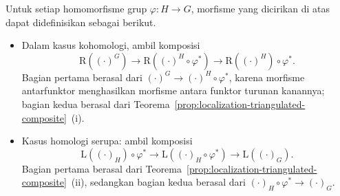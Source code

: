 \begin{lemma}\label{prop:change-of-groups-alt}
	Untuk setiap homomorfisme grup $\varphi:H\to G$, morfisme yang dicirikan di atas
	dapat didefinisikan sebagai berikut.
	\begin{itemize}
		\item Dalam kasus kohomologi, ambil komposisi
		\begin{equation}\label{eqn:change-of-group-dec-1}
			\mathrm{R}\left( (\cdot)^G \right) \to \mathrm{R}\left( (\cdot)^H \circ \varphi^* \right) \to \mathrm{R}\left( (\cdot)^H \right) \circ \varphi^* .
		\end{equation}
		Bagian pertama berasal dari
		$(\cdot)^G\to(\cdot)^H\circ\varphi^*$, karena morfisme antarfunktor
		menghasilkan morfisme antara funktor turunan kanannya; bagian kedua berasal
		dari Teorema~\ref{prop:localization-triangulated-composite}~(i).
		\item Kasus homologi serupa: ambil komposisi
		\begin{equation}\label{eqn:change-of-group-dec-2}
			\mathrm{L}\left( (\cdot)_H \right) \circ \varphi^* \to \mathrm{L} \left( (\cdot)_H \circ \varphi^* \right) \to \mathrm{L}\left( (\cdot)_G \right).
		\end{equation}
		Bagian pertama berasal dari
		Teorema~\ref{prop:localization-triangulated-composite}~(ii), sedangkan
		bagian kedua berasal dari $(\cdot)_H\circ\varphi^*\to(\cdot)_G$.
	\end{itemize}
\end{lemma}
